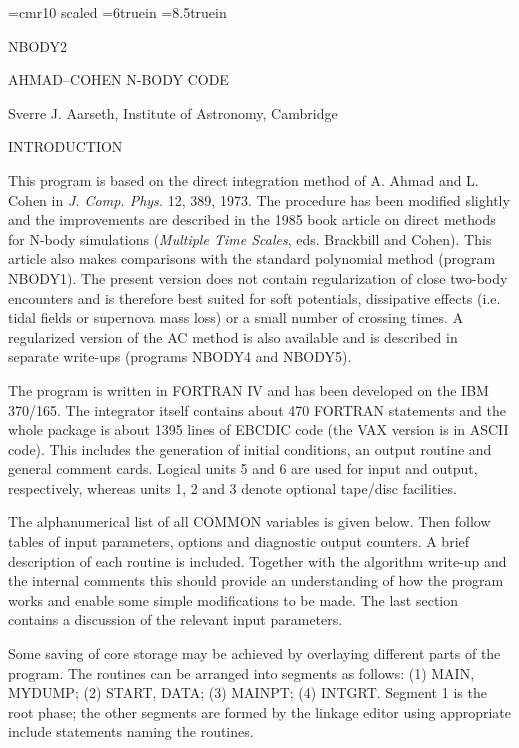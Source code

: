 \font\big=cmr10 scaled 
\vglue 3.0cm
\hsize=6truein
\vsize=8.5truein
\centerline {\big NBODY2}
\bigskip
\bigskip
\centerline {AHMAD--COHEN N-BODY CODE}
\bigskip
\centerline {Sverre J. Aarseth, Institute of Astronomy, Cambridge}
\bigskip
\bigskip
\centerline {INTRODUCTION}
\bigskip

  This program is based on the direct integration method of A. Ahmad and L.
 Cohen
 in {\it J. Comp. Phys.} 12, 389, 1973.  The procedure has been modified
 slightly
 and the improvements are described in the 1985 book article on direct
 methods for N-body simulations ({\it Multiple Time Scales}, eds.
 Brackbill and Cohen).  This article also makes comparisons with the
 standard polynomial method (program NBODY1).  The present version
 does not contain regularization of close two-body encounters
 and is therefore best suited for soft potentials, dissipative
 effects (i.e. tidal fields or supernova mass loss) or a small number
 of crossing times.  A regularized version of the AC method is also
 available and is described in separate write-ups (programs NBODY4 and
 NBODY5).

  The program is written in FORTRAN IV and has been developed on the
 IBM 370/165.  The integrator itself contains about 470 FORTRAN statements and
 the whole package is about 1395 lines of EBCDIC code (the VAX
 version is in ASCII code).  This includes the generation of initial
 conditions, an output routine and general comment cards.  Logical units
 5 and 6 are used for input and output, respectively, whereas units
 1, 2 and 3 denote optional tape/disc facilities.

  The alphanumerical list of all COMMON variables is given below.  Then follow
 tables of input parameters, options and diagnostic output counters.  A brief
 description of each routine is included.  Together with the algorithm write-up
 and the internal comments this should provide an understanding of how the
 program works and enable
 some simple modifications to be made.  The last section contains a discussion
 of the relevant input parameters.

  Some saving of core storage may be achieved by overlaying different parts of
 the program.  The routines can be arranged into segments as follows: (1) MAIN,
 MYDUMP; (2) START, DATA; (3) MAINPT; (4) INTGRT.  Segment 1 is the root phase;
 the other segments are formed by the linkage editor using appropriate
 include statements naming the routines.

